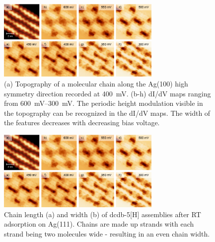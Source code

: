 \begin{figure} \centering
	\includegraphics[width=0.7\textwidth]{./images/paper/helicene/fig-S3}
	\caption{(a) Topography of a molecular chain along the Ag(100) high symmetry direction recorded at \SI{400}{\milli \volt}. (b-h) dI/dV  maps ranging from \SIrange{600}{300}{\milli \volt}. The periodic height modulation visible in the topography can be recognized in the dI/dV maps. The width of the features decreases with decreasing bias voltage.}
	\label{fig:hel-fig-S3}
\end{figure}

\begin{figure} \centering
	\includegraphics[width=0.7\textwidth]{./images/paper/helicene/fig-S3}
	\caption{Chain length (a) and width (b) of dcdb-5[H] assemblies after RT adsorption on Ag(111). Chains are made up strands with each strand being two molecules wide - resulting in an even chain width.}
	\label{fig:hel-fig-S4}
\end{figure}
